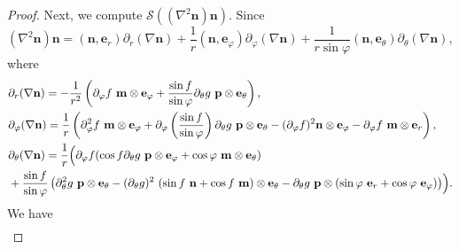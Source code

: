 \documentclass[10pt, a4paper]{article}
\newcommand\n{\mathbf{n}}
\newcommand\e{\mathbf{e}}
\newcommand\m{\mathbf{m}}
\newcommand\p{\mathbf{p}}
\newcommand\pp{\partial}
\begin{document}
\begin{proof}
Next, we compute $\mathcal{S} ((\nabla^2 \n) \n)$. Since
\begin{equation}
(\nabla^2 \n) \n  = (\n, \e_r)  \pp_r(\nabla \n) + \frac{1}{r} (\n, \e_{\varphi})  \pp_{\varphi}(\nabla \n) + \frac{1}{r \sin \varphi}(\n, \e_{\theta})  \pp_{\theta}(\nabla \n),
\end{equation}
where
\begin{equation}
\begin{aligned}
& \pp_r (\nabla \n) = - \frac{1}{r^2} \left( \partial_{\varphi} f ~ \m \otimes \e_{\varphi} + \frac{\sin f}{\sin \varphi}   \partial_{\theta} g ~ \p \otimes \e_{\theta} \right), \\
& \pp_{\varphi} (\nabla \n)  
    = \frac{1}{r} \left( \partial_{\varphi}^2 f ~ \m \otimes \e_{\varphi} +  \pp_{\varphi} \left(\frac{\sin f}{\sin \varphi}\right) \partial_{\theta} g ~ \p \otimes \e_{\theta} - (\pp_{\varphi} f)^2 \n \otimes \e_{\varphi} - \pp_{\varphi} f ~ \m \otimes \e_r  \right), \\
    & \pp_{\theta} (\nabla \n) 
    =  \frac{1}{r} \Bigl( \pp_{\varphi} f ( \cos f \pp_{\theta} g~ \p \otimes \e_{\varphi} + \cos \varphi ~ \m \otimes \e_{\theta}) \\
    & + \frac{\sin f}{\sin \varphi} \left( \pp_{\theta}^2 g ~ \p \otimes \e_{\theta} -  (\pp_{\theta} g)^2~  (\sin f ~ \n + \cos f ~ \m) \otimes \e_{\theta} -  \pp_{\theta} g~  \p \otimes (\sin \varphi ~ \e_r + \cos \varphi~ \e_{\varphi}) \right) \Bigr). \\
    \end{aligned}
\end{equation}
We have
\begin{equation}\label{Cal_sn4}
  \begin{aligned}

\end{aligned}
\end{equation}
\end{proof}
\end{document}
